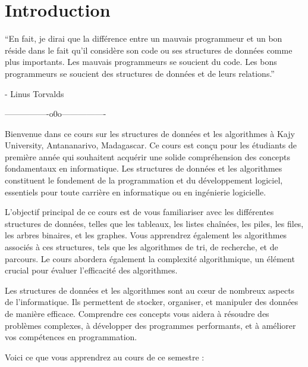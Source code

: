 \chapter*{Introduction}

\noindent ``En fait, je dirai que la différence entre un mauvais programmeur et un bon réside dans le fait qu'il considère son code ou ses structures de données comme plus importants. Les mauvais programmeurs se soucient du code. Les bons programmeurs se soucient des structures de données et de leurs relations.''

\hfill - Linus Torvalds

\begin{center}
 ----------------o0o----------------
\end{center}

Bienvenue dans ce cours sur les structures de données et les algorithmes à Kajy University, Antananarivo, Madagascar. Ce cours est conçu pour les étudiants de première année qui souhaitent acquérir une solide compréhension des concepts fondamentaux en informatique. Les structures de données et les algorithmes constituent le fondement de la programmation et du développement logiciel, essentiels pour toute carrière en informatique ou en ingénierie logicielle.

L'objectif principal de ce cours est de vous familiariser avec les différentes structures de données, telles que les tableaux, les listes chaînées, les piles, les files, les arbres binaires, et les graphes. Vous apprendrez également les algorithmes associés à ces structures, tels que les algorithmes de tri, de recherche, et de parcours. Le cours abordera également la complexité algorithmique, un élément crucial pour évaluer l'efficacité des algorithmes.

Les structures de données et les algorithmes sont au cœur de nombreux aspects de l'informatique. Ils permettent de stocker, organiser, et manipuler des données de manière efficace. Comprendre ces concepts vous aidera à résoudre des problèmes complexes, à développer des programmes performants, et à améliorer vos compétences en programmation.

Voici ce que vous apprendrez au cours de ce semestre :

